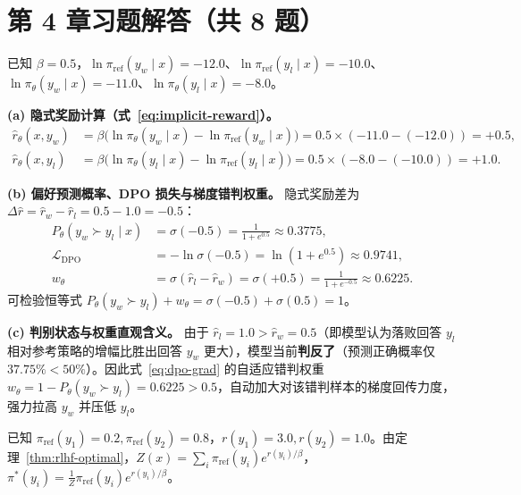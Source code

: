 \section*{第 4 章习题解答（共 8 题）}


已知 $\beta = 0.5$，$\ln \pi_{\mathrm{ref}}(y_w \mid x) = -12.0$、$\ln \pi_{\mathrm{ref}}(y_l \mid x) = -10.0$、$\ln \pi_\theta(y_w \mid x) = -11.0$、$\ln \pi_\theta(y_l \mid x) = -8.0$。

\textbf{(a) 隐式奖励计算（式~\eqref{eq:implicit-reward}）。}
\begin{align*}
  \hat{r}_\theta(x, y_w) &= \beta \big(\ln \pi_\theta(y_w \mid x) - \ln \pi_{\mathrm{ref}}(y_w \mid x)\big) = 0.5 \times (-11.0 - (-12.0)) = \mathbf{+0.5}, \\
  \hat{r}_\theta(x, y_l) &= \beta \big(\ln \pi_\theta(y_l \mid x) - \ln \pi_{\mathrm{ref}}(y_l \mid x)\big) = 0.5 \times (-8.0 - (-10.0)) = \mathbf{+1.0}.
\end{align*}

\textbf{(b) 偏好预测概率、DPO 损失与梯度错判权重。} 隐式奖励差为 $\Delta \hat{r} = \hat{r}_w - \hat{r}_l = 0.5 - 1.0 = -0.5$：
\begin{align*}
  P_\theta(y_w \succ y_l \mid x) &= \sigma(-0.5) = \frac{1}{1 + e^{0.5}} \approx \mathbf{0.3775}, \\
  \mathcal{L}_{\mathrm{DPO}} &= -\ln \sigma(-0.5) = \ln(1 + e^{0.5}) \approx \mathbf{0.9741}, \\
  w_\theta &= \sigma(\hat{r}_l - \hat{r}_w) = \sigma(+0.5) = \frac{1}{1 + e^{-0.5}} \approx \mathbf{0.6225}.
\end{align*}
可检验恒等式 $P_\theta(y_w \succ y_l) + w_\theta = \sigma(-0.5) + \sigma(0.5) = 1$。

\textbf{(c) 判别状态与权重直观含义。} 由于 $\hat{r}_l = 1.0 > \hat{r}_w = 0.5$（即模型认为落败回答 $y_l$ 相对参考策略的增幅比胜出回答 $y_w$ 更大），模型当前\textbf{判反了}（预测正确概率仅 $37.75\% < 50\%$）。因此式~\eqref{eq:dpo-grad} 的自适应错判权重 $w_\theta = 1 - P_\theta(y_w \succ y_l) = 0.6225 > 0.5$，自动加大对该错判样本的梯度回传力度，强力拉高 $y_w$ 并压低 $y_l$。


已知 $\pi_{\mathrm{ref}}(y_1) = 0.2, \pi_{\mathrm{ref}}(y_2) = 0.8$，$r(y_1) = 3.0, r(y_2) = 1.0$。由定理~\ref{thm:rlhf-optimal}，$Z(x) = \sum_i \pi_{\mathrm{ref}}(y_i) e^{r(y_i)/\beta}$，$\pi^*(y_i) = \frac{1}{Z}\pi_{\mathrm{ref}}(y_i) e^{r(y_i)/\beta}$。

